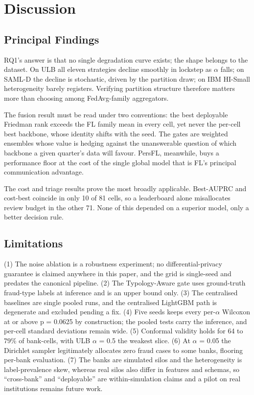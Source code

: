 \documentclass[a4paper, 10pt, conference]{ieeeconf}
\begin{document}
\section{Discussion}

\subsection{Principal Findings}
RQ1's answer is that no single degradation curve exists; the shape belongs to
the dataset. On ULB all eleven strategies decline smoothly in lockstep as
$\alpha$ falls; on SAML-D the decline is stochastic, driven by the partition
draw; on IBM HI-Small heterogeneity barely registers. Verifying partition
structure therefore matters more than choosing among FedAvg-family aggregators.

The fusion result must be read under two conventions: the best deployable
Friedman rank exceeds the FL family mean in every cell, yet never the per-cell
best backbone, whose identity shifts with the seed. The gates are weighted
ensembles whose value is hedging against the unanswerable question of which
backbone a given quarter's data will favour. PersFL, meanwhile, buys a
performance floor at the cost of the single global model that is FL's principal
communication advantage.

The cost and triage results prove the most broadly applicable. Best-AUPRC and
cost-best coincide in only 10 of 81 cells, so a leaderboard alone misallocates
review budget in the other 71. None of this depended on a superior model, only a
better decision rule.

\subsection{Limitations}
(1) The noise ablation is a robustness experiment; no differential-privacy
guarantee is claimed anywhere in this paper, and the grid is single-seed and
predates the canonical pipeline. (2) The Typology-Aware gate uses ground-truth
fraud-type labels at inference and is an upper bound only. (3) The centralised
baselines are single pooled runs, and the centralised LightGBM path is
degenerate and excluded pending a fix. (4) Five seeds keeps every per-$\alpha$
Wilcoxon at or above p = 0.0625 by construction; the pooled tests carry the
inference, and per-cell standard deviations remain wide. (5) Conformal validity
holds for 64 to 79\% of bank-cells, with ULB $\alpha$ = 0.5 the weakest slice.
(6) At $\alpha$ = 0.05 the Dirichlet sampler legitimately allocates zero fraud
cases to some banks, flooring per-bank evaluation. (7) The banks are simulated
silos and the heterogeneity is label-prevalence skew, whereas real silos also
differ in features and schemas, so ``cross-bank'' and ``deployable'' are
within-simulation claims and a pilot on real institutions remains future work.
\end{document}
